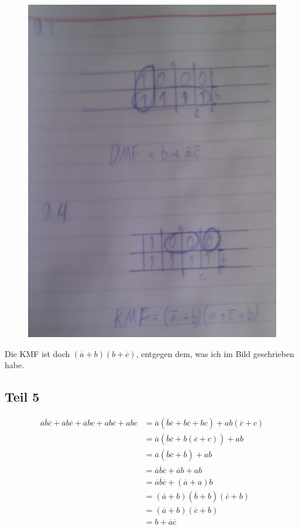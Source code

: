 \documentclass[10pt,a4paper]{article}
\begin{document}
\begin{figure}[H]
\includegraphics[width=400pt]{9_3,4}
\end{figure}

Die KMF ist doch $(\overline{a} + b)(b + \overline{c})$, entgegen dem, was ich im Bild geschrieben habe.

\subsection*{Teil 5}

\begin{align*}
\overline{a}\overline{b}\overline{c} + \overline{a}b\overline{c} + \overline{a}bc + ab\overline{c} + abc & = \overline{a}(\overline{b}\overline{c} + b\overline{c} + bc) + ab(\overline{c} + c)\\
& = \overline{a}(\overline{b}\overline{c} + b(\overline{c} + c)) + ab\\
& = \overline{a}(\overline{b}\overline{c} + b) + ab\\
& = \overline{a}\overline{b}\overline{c} + \overline{a}b + ab\\
& = \overline{a}\overline{b}\overline{c} + (\overline{a} + a)b\\
& = (\overline{a} + b)(\overline{b} + b)(\overline{c} + b)\\
& = (\overline{a} + b)(\overline{c} + b)\\
& = b + \overline{a}\overline{c}
\end{align*}
\end{document}
